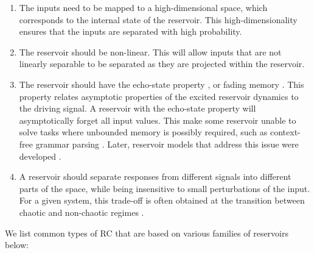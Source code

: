 \begin{enumerate}
  \item The inputs need to be mapped to a high-dimensional space, which
        corresponds to the internal state of the reservoir. This
        high-dimensionality ensures that the inputs are separated with high
        probability.

  \item The reservoir should be non-linear. This will allow inputs that are not
        linearly separable to be separated as they are projected within the
        reservoir.

  \item The reservoir should have the echo-state property
        \parencite{jaegerEchoStateApproach2001, yildizRevisitingEchoState2012},
        or fading memory \parencite{boydFadingMemoryProblem1985,
        maassRealTimeComputingStable2002, maassFadingMemoryKernel2004}. This
        property relates asymptotic properties of the excited reservoir dynamics
        to the driving signal. A reservoir with the echo-state property will
        asymptotically forget all input values. This make some reservoir unable
        to solve tasks where unbounded memory is possibly required, such as
        context-free grammar parsing
        \parencite{schmidhuberTrainingRecurrentNetworks2007}. Later, reservoir
        models that address this issue were developed
        \parencite{pascanuNeurodynamicalModelWorking2011}.

  \item A reservoir should separate responses from different signals into
        different parts of the space, while being insensitive to small
        perturbations of the input. For a given system, this trade-off is often
        obtained at the transition between chaotic and non-chaotic regimes
        \parencite{bertschingerRealtimeComputationEdge2004,
        legensteinEdgeChaosPrediction2007}.
\end{enumerate}

We list common types of \ac{RC} that are based on various families of reservoirs
below:

